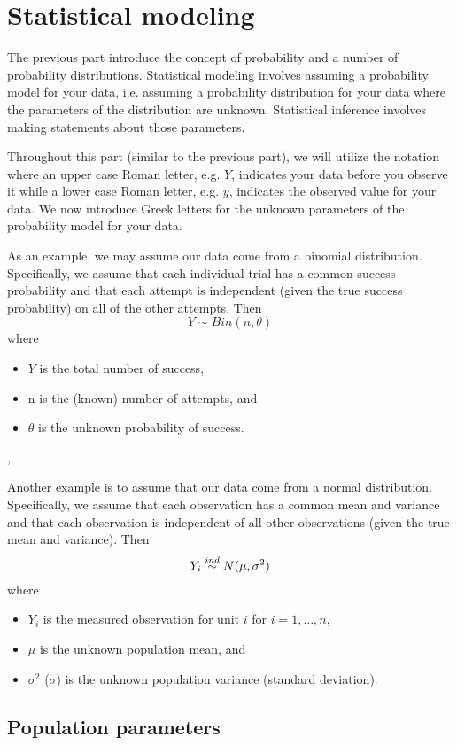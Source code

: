 
\chapter{Statistical modeling}

The previous part introduce the concept of probability and a number of 
probability distributions.
Statistical modeling involves assuming a probability model for your data,
i.e. assuming a probability distribution for your data
where the parameters of the distribution are unknown.
Statistical inference involves making statements about those parameters.

Throughout this part (similar to the previous part),
we will utilize the notation where an upper case Roman letter, e.g. $Y$,
indicates your data before you observe it
while a lower case Roman letter, e.g. $y$,
indicates the observed value for your data. 
We now introduce Greek letters for the unknown parameters of the probability 
model for your data.

As an example, 
we may assume our data come from a binomial distribution.
Specifically, 
we assume that each individual trial has a common success probability and 
that each attempt is independent (given the true success probability) on 
all of the other attempts. 
Then 
\[ Y\sim Bin(n,\theta) \]
where 
\begin{itemize}
\item $Y$ is the total number of success,
\item n is the (known) number of attempts, and
\item $\theta$ is the unknown probability of success.
\end{itemize},
 
Another example is to assume that our data come from a normal distribution.
Specifically,
we assume that each observation has a common mean and variance and that each 
observation is independent of all other observations (given the true mean and
variance).
Then 
\[ Y_i\stackrel{ind}{\sim} N(\mu,\sigma^2) \]
where 
\begin{itemize}
\item $Y_i$ is the measured observation for unit $i$ for $i=1,\ldots,n$,
\item $\mu$ is the unknown population mean, and
\item $\sigma^2$ ($\sigma$) is the unknown population variance (standard 
deviation).
\end{itemize}


\section{Population parameters}

